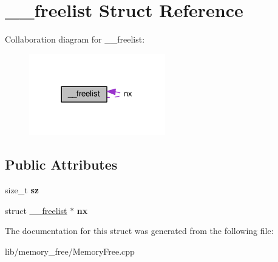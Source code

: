 \hypertarget{struct____freelist}{}\section{\+\_\+\+\_\+freelist Struct Reference}
\label{struct____freelist}


Collaboration diagram for \+\_\+\+\_\+freelist\+:
\nopagebreak
\begin{figure}[H]
\begin{center}
\leavevmode
\includegraphics[width=168pt]{struct____freelist__coll__graph}
\end{center}
\end{figure}
\subsection*{Public Attributes}
\begin{DoxyCompactItemize}
\item 
size\+\_\+t {\bfseries sz}\hypertarget{struct____freelist_a400b91c9baf14861360a1c1caba8309d}{}\label{struct____freelist_a400b91c9baf14861360a1c1caba8309d}

\item 
struct \hyperlink{struct____freelist}{\+\_\+\+\_\+freelist} $\ast$ {\bfseries nx}\hypertarget{struct____freelist_abfcbc656d931bb3fc6f5b3f3deec41cd}{}\label{struct____freelist_abfcbc656d931bb3fc6f5b3f3deec41cd}

\end{DoxyCompactItemize}


The documentation for this struct was generated from the following file\+:\begin{DoxyCompactItemize}
\item 
lib/memory\+\_\+free/Memory\+Free.\+cpp\end{DoxyCompactItemize}
